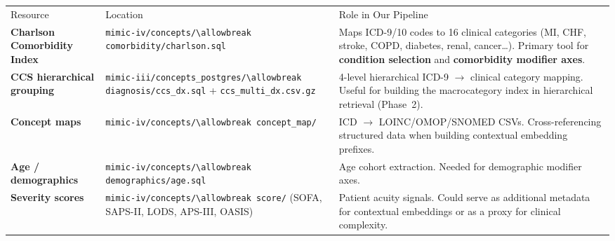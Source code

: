 \documentclass[11pt,a4paper]{article}
\newcommand{\field}[1]{\nolinkurl{#1}}
\newcommand{\mr}{\specialrule{0.4pt}{4pt}{4pt}}
\begin{document}
\begin{center}
	\small
	\begin{tabular}{p{4.2cm}p{5.4cm}p{6cm}}
		Resource                                                       & Location & Role in Our Pipeline \\
		\mr
		\textbf{Charlson Comorbidity Index}                            &
		\field{mimic-iv/concepts/\allowbreak comorbidity/charlson.sql} &
		Maps ICD-9/10 codes to 16 clinical categories (MI, CHF, stroke, COPD,
		diabetes, renal, cancer\ldots).  Primary tool for \textbf{condition
		selection} and \textbf{comorbidity modifier axes}.                                               \\
		\addlinespace
		\textbf{CCS hierarchical grouping}                             &
		\field{mimic-iii/concepts\_postgres/\allowbreak diagnosis/ccs\_dx.sql}
		+ \field{ccs\_multi\_dx.csv.gz}                                &
		4-level hierarchical ICD-9 $\to$ clinical category mapping.
		Useful for building the macrocategory index in hierarchical retrieval
		(Phase~2).                                                                                       \\
		\addlinespace
		\textbf{Concept maps}                                          &
		\field{mimic-iv/concepts/\allowbreak concept\_map/}            &
		ICD $\to$ LOINC/OMOP/SNOMED CSVs.  Cross-referencing structured data
		when building contextual embedding prefixes.                                                     \\
		\addlinespace
		\textbf{Age / demographics}                                    &
		\field{mimic-iv/concepts/\allowbreak demographics/age.sql}     &
		Age cohort extraction.  Needed for demographic modifier axes.                                    \\
		\addlinespace
		\textbf{Severity scores}                                       &
		\field{mimic-iv/concepts/\allowbreak score/} (SOFA, SAPS-II, LODS,
		APS-III, OASIS)                                                &
		Patient acuity signals.  Could serve as additional metadata for
		contextual embeddings or as a proxy for clinical complexity.                                     \\
	\end{tabular}
\end{center}
\end{document}
